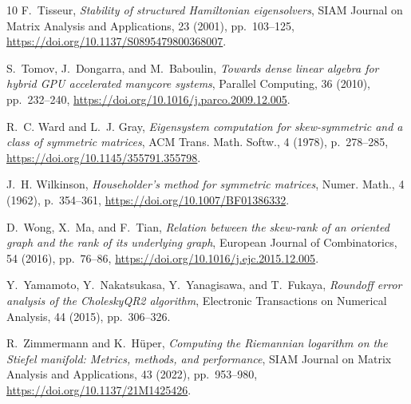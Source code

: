 \documentclass[final,onefignum,onetabnum,dvipsnames]{siamart251216}
\numberwithin{algorithm}{section}
\numberwithin{equation}{section}
\begin{document}
\begin{thebibliography}{10}
{\sc F.~Tisseur}, {\em Stability of structured {H}amiltonian eigensolvers}, SIAM Journal on Matrix Analysis and Applications, 23 (2001), pp.~103--125, \url{https://doi.org/10.1137/S0895479800368007}.

{\sc S.~Tomov, J.~Dongarra, and M.~Baboulin}, {\em Towards dense linear algebra for hybrid {GPU} accelerated manycore systems}, Parallel Computing, 36 (2010), pp.~232--240, \url{https://doi.org/10.1016/j.parco.2009.12.005}.

{\sc R.~C. Ward and L.~J. Gray}, {\em Eigensystem computation for skew-symmetric and a class of symmetric matrices}, ACM Trans. Math. Softw., 4 (1978), p.~278–285, \url{https://doi.org/10.1145/355791.355798}.

{\sc J.~H. Wilkinson}, {\em Householder's method for symmetric matrices}, Numer. Math., 4 (1962), p.~354–361, \url{https://doi.org/10.1007/BF01386332}.

{\sc D.~Wong, X.~Ma, and F.~Tian}, {\em Relation between the skew-rank of an oriented graph and the rank of its underlying graph}, European Journal of Combinatorics, 54 (2016), pp.~76--86, \url{https://doi.org/10.1016/j.ejc.2015.12.005}.

{\sc Y.~Yamamoto, Y.~Nakatsukasa, Y.~Yanagisawa, and T.~Fukaya}, {\em Roundoff error analysis of the {C}holesky{QR}2 algorithm}, Electronic Transactions on Numerical Analysis, 44 (2015), pp.~306--326.

{\sc R.~Zimmermann and K.~H{\"u}per}, {\em Computing the {R}iemannian logarithm on the {S}tiefel manifold: Metrics, methods, and performance}, SIAM Journal on Matrix Analysis and Applications, 43 (2022), pp.~953--980, \url{https://doi.org/10.1137/21M1425426}.

\end{thebibliography}
\end{document}
